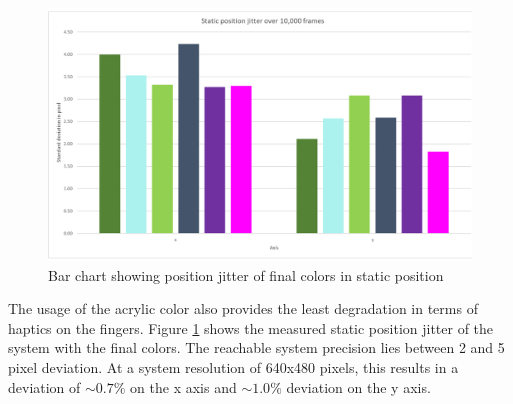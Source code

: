 \begin{figure}[H]
\centering
\includegraphics[width=\textwidth]{images/acrylic_color_jitter.jpg}
\caption{Bar chart showing position jitter of final colors in static position}
\label{img:color_jitter}
\end{figure}
 The usage of the acrylic color also provides the least degradation in terms of haptics on the fingers. Figure \ref{img:color_jitter} shows the measured static position jitter of the system with the final colors. The reachable system precision lies between 2 and 5 pixel deviation. At a system resolution of 640x480 pixels, this results in a deviation of $\sim 0.7\%$ on the x axis and $\sim 1.0\%$ deviation on the y axis.
 \newpage
